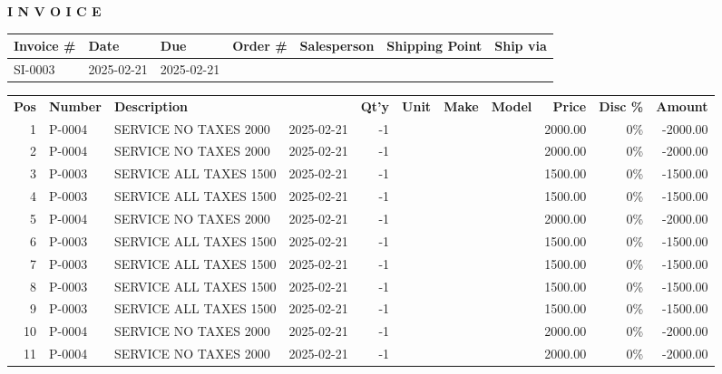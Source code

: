 \documentclass{scrartcl}
\begin{document}
\vspace{1cm}

\textbf{I N V O I C E}
\hfill

\vspace{1cm}

\begin{tabularx}{\textwidth}{*{7}{|X}|} \hline
  \textbf{Invoice \#} & \textbf{Date} & \textbf{Due} & \textbf{Order \#}
  & \textbf{Salesperson} & \textbf{Shipping Point} & \textbf{Ship via} \\ [0.5em]
  \hline
  SI-0003 & 2025-02-21 & 2025-02-21 &  & 
  &  &  \\
  \hline
\end{tabularx}

\vspace{1cm}

\begin{tabularx}{\textwidth}{@{}rlXlrlllrrr@{}}
  \textbf{Pos} & \textbf{Number} & \textbf{Description} & & \textbf{Qt'y} &
    \textbf{Unit} & \textbf{Make} & \textbf{Model} & \textbf{Price} & \textbf{Disc \%} & \textbf{Amount} \\ [0.5em]
  1 & P-0004 & SERVICE NO TAXES 2000 & 2025-02-21 &
  -1 &  &  &  & 2000.00 & 0\% & -2000.00 \\
  2 & P-0004 & SERVICE NO TAXES 2000 & 2025-02-21 &
  -1 &  &  &  & 2000.00 & 0\% & -2000.00 \\
  3 & P-0003 & SERVICE ALL TAXES 1500 & 2025-02-21 &
  -1 &  &  &  & 1500.00 & 0\% & -1500.00 \\
  4 & P-0003 & SERVICE ALL TAXES 1500 & 2025-02-21 &
  -1 &  &  &  & 1500.00 & 0\% & -1500.00 \\
  5 & P-0004 & SERVICE NO TAXES 2000 & 2025-02-21 &
  -1 &  &  &  & 2000.00 & 0\% & -2000.00 \\
  6 & P-0003 & SERVICE ALL TAXES 1500 & 2025-02-21 &
  -1 &  &  &  & 1500.00 & 0\% & -1500.00 \\
  7 & P-0003 & SERVICE ALL TAXES 1500 & 2025-02-21 &
  -1 &  &  &  & 1500.00 & 0\% & -1500.00 \\
  8 & P-0003 & SERVICE ALL TAXES 1500 & 2025-02-21 &
  -1 &  &  &  & 1500.00 & 0\% & -1500.00 \\
  9 & P-0003 & SERVICE ALL TAXES 1500 & 2025-02-21 &
  -1 &  &  &  & 1500.00 & 0\% & -1500.00 \\
  10 & P-0004 & SERVICE NO TAXES 2000 & 2025-02-21 &
  -1 &  &  &  & 2000.00 & 0\% & -2000.00 \\
  11 & P-0004 & SERVICE NO TAXES 2000 & 2025-02-21 &
  -1 &  &  &  & 2000.00 & 0\% & -2000.00 \\

\end{tabularx}
\end{document}
